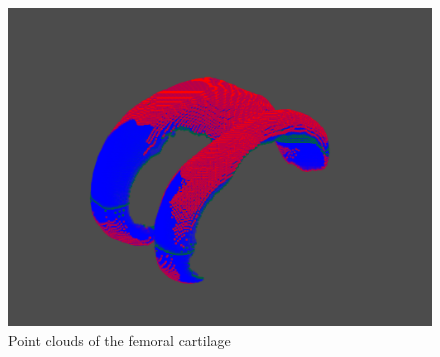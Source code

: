 \begin{figure}[htb!]
	\centering
	\includegraphics[width=\linewidth]{./figures/s4}
	\caption{Point clouds of the femoral cartilage}
	\label{fig:femoral_point_cloud}
\end{figure}

